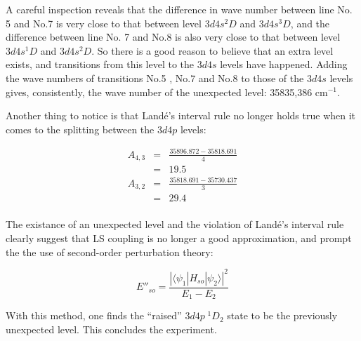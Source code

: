 \documentclass[a4paper]{article}
\begin{document}
A careful inspection reveals that the difference in wave number between line No. 5 and No.7 is very close to that between level $3d4s ^{2}D$ and $3d4s ^{3}D$, and the difference between line No. 7 and No.8 is also very close to that between level $3d4s ^{1}D$ and $3d4s ^{2}D$. So there is a good reason to believe that an extra level exists, and transitions from this level to the $3d4s$ levels have happened. Adding the wave numbers of transitions No.5 , No.7 and No.8 to those of the $3d4s$ levels gives, consistently, the wave number of the unexpected level: 35835,386 cm$^{-1}$.

Another thing to notice is that Land\'e's interval rule no longer holds true when it comes to the splitting between the $3d4p$ levels:

\begin{eqnarray*}

A_{4,3} &=& \frac{35896.872 - 35818.691}{4} \\

&=& 19.5 \\

A_{3,2} &=& \frac{35818.691 - 35730.437}{3} \\

&=& 29.4 \\

\end{eqnarray*}

The existance of an unexpected level and the violation of Land\'e's interval rule clearly suggest that LS coupling is no longer a good approximation, and prompt the the use of second-order perturbation theory:

\[

E''_{so} = \frac{|\langle \psi_1 | H_{so} | \psi_2 \rangle|^2}{E_1 - E_2}

\]

With this method, one finds the ``raised'' $3d4p\;^1D_2$ state to be the previously unexpected level. This concludes the experiment.
\end{document}
